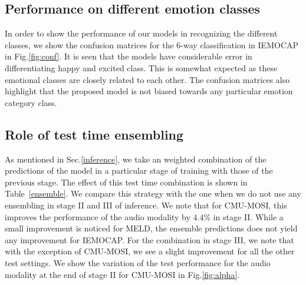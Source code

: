 \documentclass[lettersize,journal]{IEEEtran}
\begin{document}
\subsection{Performance on different emotion classes}
In order to show the performance of our models in recognizing the different classes, we show the confusion matrices for the 6-way classification in IEMOCAP in Fig.\ref{fig:conf}. It is seen that the models have considerable error in differentiating happy and excited class. This is somewhat expected as these emotional classes are closely related to each other. The confusion matrices also highlight that the proposed model is not biased towards any particular emotion category class. 
\subsection{Role of test time ensembling}
As mentioned in Sec.\ref{inference}, we take an weighted combination of the predictions of the model in a particular stage of training with those of the previous stage. The effect of this test time combination is shown in Table~\ref{ensemble}. We compare this strategy with the one when we do not use any ensembling in stage II and III of inference. We note that for CMU-MOSI, this improves the performance of the audio modality by $4.4\%$ in stage II. While a small improvement is noticed for MELD, the ensemble predictions does not yield any improvement for IEMOCAP. For the combination in stage III, we note that with the exception of CMU-MOSI, we see a slight improvement for all the other test settings. We show the variation of the test performance for the audio modality at the end of stage II for CMU-MOSI in Fig.\ref{fig:alpha}.
\end{document}
